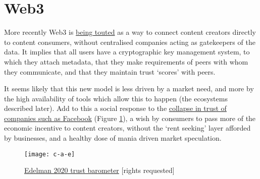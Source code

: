 \section{Web3}
More recently Web3 is \href{https://trends.google.com/trends/explore?date=all&q=web3}{being touted} as a way to connect content creators directly to content consumers, without centralised companies acting as gatekeepers of the data. It implies that all users have a cryptographic key management system, to which they attach metadata, that they make requirements of peers with whom they communicate, and that they maintain trust `scores' with peers.\par
It seems likely that this new model is less driven by a market need, and more by the high availability of tools which allow this to happen (the ecosystems described later). Add to this a social response to the \href{https://finance.yahoo.com/news/meta-facebook-worst-company-of-the-year-yahoo-finance-165345819.html}{collapse in trust of companies such as Facebook} (Figure \ref{fig:trustbarometer}), a wish by consumers to pass more of the economic incentive to content creators, without the `rent seeking' layer afforded by businesses, and a healthy dose of mania driven market speculation. 

\begin{figure}
  \centering
    \texttt{[image: c-a-e]}
  \caption{\href{https://www.edelman.com/trust/2020-trust-barometer}{Edelman 2020 trust barometer} [rights requested]}
  \label{fig:trustbarometer}
\end{figure}
